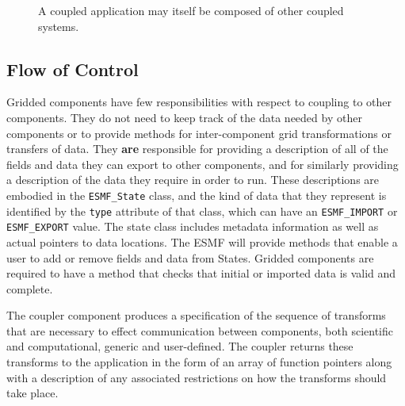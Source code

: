 \begin{figure}
\caption[{Scoping of Components in a Coupled Application}]{A coupled
application may itself be composed of other coupled systems.}
\label{fig:couplerscaling}
\end{figure}

\subsection{Flow of Control}

Gridded components have few responsibilities with respect to coupling
to other components.  They do not need to keep track of the data needed
by other components or to provide methods for inter-component 
grid transformations or transfers of data.  They {\bf are} responsible for 
providing a description of all of the fields and data they
can export to other components, and for similarly providing a description 
of the data they require in order to run.  These descriptions are
embodied in the {\tt ESMF\_State} class, and the kind of data that they 
represent is identified by the {\tt type} attribute of that class, which can
have an {\tt ESMF\_IMPORT} or {\tt ESMF\_EXPORT} value.  The state class
includes metadata information as well as actual pointers to data 
locations.  The ESMF will provide methods that enable a user to add or
remove fields and data from States.  Gridded components are required to 
have a method that checks that initial or imported data is valid and 
complete.  

The coupler component produces a specification of the sequence of 
transforms that are necessary to effect communication between components, 
both scientific and computational, generic and user-defined.  The coupler 
returns these transforms to the application in the form of an array of 
function pointers along with a description of any associated restrictions 
on how the transforms should take place.

